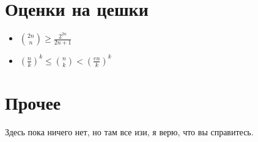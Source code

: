 \documentclass{article}
\renewcommand{\geq}{\geqslant}
\renewcommand{\leq}{\leqslant}
\begin{document}
\section{Оценки на цешки}
\begin{itemize}
    \item $\binom{2n}{n} \geq \frac{2^{2n}}{2n + 1}$
    \item ${\left(\frac{n}{k}\right)}^k \leq \binom{n}{k} < {\left(\frac{en}{k}\right)}^k$
\end{itemize}

\section{Прочее}
Здесь пока ничего нет, но там все изи, я верю, что вы справитесь.
\end{document}
